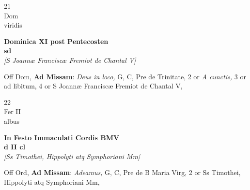 \documentclass[10pt, openany]{book}
\begin{document}
        \begin{center}
            \begin{minipage}{3.5in}
                \vspace{2em}
                \begin{minipage}{0.5in}
                    {\Huge 21} \\
                    {\normalsize Dom} \\
                    {\normalsize viridis}
                \end{minipage}
                \begin{minipage}{3.0in}
                    \textbf{ \large Dominica XI post Pentecosten \\
                    \textnormal{\normalsize sd}} \\ \textit{[S Joannæ Franciscæ Fremiot de Chantal V]} \\ 
                \end{minipage}
                \begin{justify}Off Dom, \textbf{Ad Missam}: \textit{Deus in loco,} G, C, Pre de Trinitate, 2 or \textit{A cunctis,} 3 or ad libitum, 4 or S Joannæ Franciscæ Fremiot de Chantal V,  
                \end{justify}
            \end{minipage}
        \end{center}
    
        \begin{center}
            \begin{minipage}{3.5in}
                \vspace{2em}
                \begin{minipage}{0.5in}
                    {\Huge 22} \\
                    {\normalsize Fer II} \\
                    {\normalsize albus}
                \end{minipage}
                \begin{minipage}{3.0in}
                    \textbf{ \large In Festo Immaculati Cordis BMV \\
                    \textnormal{\normalsize d II cl}} \\ \textit{[Ss Timothei, Hippolyti atq Symphoriani Mm]} \\ 
                \end{minipage}
                \begin{justify}Off Ord, \textbf{Ad Missam}: \textit{Adeamus,} G, C, Pre de B Maria Virg, 2 or Ss Timothei, Hippolyti atq Symphoriani Mm,  
                \end{justify}
            \end{minipage}
        \end{center}
    
\end{document}
